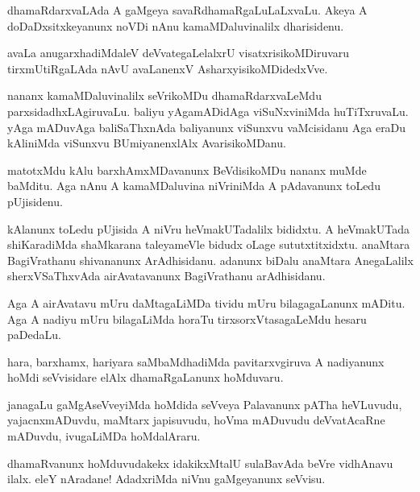 \documentclass{article}
\begin{document}
\begin{mng}%
dhamaRdarxvaLAda A gaMgeya savaRdhamaRgaLuLaLxvaLu. Akeya A 
doDaDxsitxkeyanunx noVDi nAnu kamaMDaluvinalilx dharisidenu.
\end{mng}

\begin{mng}%
avaLa anugarxhadiMdaleV deVvategaLelalxrU visatxrisikoMDiruvaru 
tirxmUtiRgaLAda nAvU avaLanenxV AsharxyisikoMDidedxVve.
\end{mng}

\begin{mng}%
nananx kamaMDaluvinalilx seVrikoMDu dhamaRdarxvaLeMdu 
parxsidadhxLAgiruvaLu. baliyu yAgamADidAga viSuNxviniMda huTiTxruvaLu. 
yAga mADuvAga baliSaThxnAda baliyanunx viSunxvu vaMcisidanu Aga eraDu 
kAliniMda viSunxvu BUmiyanenxlAlx AvarisikoMDanu.
\end{mng}

\begin{mng}%
matotxMdu kAlu barxhAmxMDavanunx BeVdisikoMDu nananx muMde baMditu. 
Aga nAnu A kamaMDaluvina niVriniMda A pAdavanunx toLedu pUjisidenu.
\end{mng}

\begin{mng}%
kAlanunx toLedu pUjisida A niVru heVmakUTadalilx bididxtu. A 
heVmakUTada shiKaradiMda shaMkarana taleyameVle bidudx oLage 
sututxtitxidxtu. anaMtara BagiVrathanu shivananunx ArAdhisidanu. 
adanunx biDalu anaMtara AnegaLalilx sherxVSaThxvAda airAvatavanunx 
BagiVrathanu arAdhisidanu.
\end{mng}

\begin{mng}%
Aga A airAvatavu mUru daMtagaLiMDa tividu mUru bilagagaLanunx mADitu. 
Aga A nadiyu mUru bilagaLiMda horaTu tirxsorxVtasagaLeMdu hesaru 
paDedaLu.
\end{mng}

\begin{mng}%
hara, barxhamx, hariyara saMbaMdhadiMda pavitarxvgiruva A nadiyanunx 
hoMdi seVvisidare elAlx dhamaRgaLanunx hoMduvaru.
\end{mng}

\begin{mng}%
janagaLu gaMgAseVveyiMda hoMdida seVveya Palavanunx pATha heVLuvudu, 
yajacnxmADuvdu, maMtarx japisuvudu, hoVma mADuvudu deVvatAcaRne 
mADuvdu, ivugaLiMDa hoMdalAraru.
\end{mng}

\begin{mng}%
dhamaRvanunx hoMduvudakekx idakikxMtalU sulaBavAda beVre vidhAnavu 
ilalx. eleY nAradane! AdadxriMda niVnu gaMgeyanunx seVvisu.
\end{mng}
\end{document}
